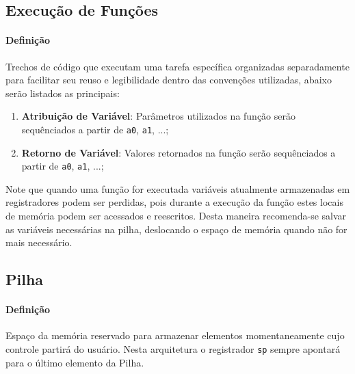 \documentclass{article}
\begin{document}
        \subsection{Execução de Funções}
            \paragraph{Definição}Trechos de código que executam uma tarefa específica organizadas separadamente para facilitar seu reuso e legibilidade dentro das convenções utilizadas, abaixo serão listados as principais:
                \begin{enumerate}[noitemsep]
                    \item \textbf{Atribuição de Variável}: Parâmetros utilizados na função serão sequênciados a partir de \texttt{a0}, \texttt{a1}, ...;

                    \item \textbf{Retorno de Variável}: Valores retornados na função serão sequênciados a partir de \texttt{a0}, \texttt{a1}, ...; 
                \end{enumerate}
            Note que quando uma função for executada variáveis atualmente armazenadas em registradores podem ser perdidas, pois durante a execução da função estes locais de memória podem ser acessados e reescritos. Desta maneira recomenda-se salvar as variáveis necessárias na pilha, deslocando o espaço de memória quando não for mais necessário.

        \subsection{Pilha}
            \paragraph{Definição}Espaço da memória reservado para armazenar elementos momentaneamente cujo controle partirá do usuário. Nesta arquitetura o registrador \texttt{sp} sempre apontará para o último elemento da Pilha.
\end{document}
